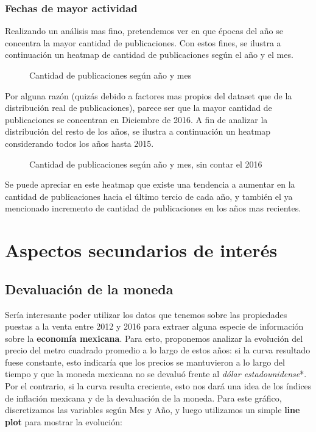 \documentclass[
10pt, %
a4paper, %
oneside, %
headinclude,footinclude, %
BCOR5mm, %
]{scrartcl}
\begin{document}
    \subsubsection{Fechas de mayor actividad}
    Realizando un análisis mas fino, pretendemos ver en que épocas del año se concentra la mayor cantidad de publicaciones. Con estos fines, se ilustra a continuación un heatmap de cantidad de publicaciones según el año y el mes.
    
    \begin{figure}[H]
        \caption{Cantidad de publicaciones según año y mes}
        \label{fig:publicaciones-mes-anio}
    \end{figure}
    
    Por alguna razón (quizás debido a factores mas propios del dataset que de la distribución real de publicaciones), parece ser que la mayor cantidad de publicaciones se concentran en Diciembre de 2016. A fin de analizar la distribución del resto de los años, se ilustra a continuación un heatmap considerando todos los años hasta 2015.
    
    \begin{figure}[H]
        \caption{Cantidad de publicaciones según año y mes, sin contar el 2016}
        \label{fig:publicaciones-mes-anio-sin-2016}
    \end{figure}
    
    Se puede apreciar en este heatmap que existe una tendencia a aumentar en la cantidad de publicaciones hacia el último tercio de cada año, y también el ya mencionado incremento de cantidad de publicaciones en los años mas recientes.

 
\newpage
    \section{Aspectos secundarios de inter\'es}
    \subsection{Devaluaci\'on de la moneda}
    Ser\'ia interesante poder utilizar los datos que tenemos sobre las propiedades puestas a la venta entre 2012 y 2016 para extraer alguna especie de informaci\'on sobre la \textbf{econom\'ia mexicana}.
    \vskip 2mm
    Para esto, proponemos analizar la evoluci\'on del precio del metro cuadrado promedio a lo largo de estos años: si la curva resultado fuese constante, esto indicar\'ia que los precios se mantuvieron a lo largo del tiempo y que la moneda mexicana no se devalu\'o frente al \textit{d\'olar estadounidense}*.
    Por el contrario, si la curva resulta creciente, esto nos dar\'a una idea de los \'indices de inflaci\'on mexicana y de la devaluaci\'on de la moneda.
    \vskip 2mm
    Para este gr\'afico, discretizamos las variables seg\'un Mes y Año, y luego utilizamos un simple \textbf{line plot} para mostrar la evoluci\'on:
    
\end{document}
